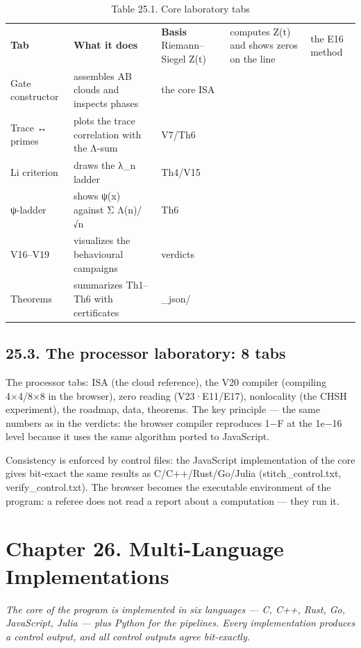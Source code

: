 \documentclass[11pt,a4paper]{article}
\begin{document}
\begin{table}[htbp]\centering\small
\caption{Table 25.1. Core laboratory tabs}
\begin{tabular}{p{} p{} p{}}
\toprule
\textbf{Tab} & \textbf{What it does} & \textbf{Basis}
\midrule
Riemann–Siegel Z(t) & computes Z(t) and shows zeros on the line & the E16 method \\
Gate constructor & assembles AB clouds and inspects phases & the core ISA \\
Trace ↔ primes & plots the trace correlation with the Λ-sum & V7/Th6 \\
Li criterion & draws the λ\_n ladder & Th4/V15 \\
ψ-ladder & shows ψ(x) against Σ Λ(n)/√n & Th6 \\
V16–V19 & visualizes the behavioural campaigns & verdicts \\
Theorems & summarizes Th1–Th6 with certificates & \_json/ \\
\bottomrule
\end{tabular}
\end{table}

\subsection{25.3. The processor laboratory: 8 tabs}

The processor tabs: ISA (the cloud reference), the V20 compiler (compiling 4×4/8×8 in the browser), zero reading (V23·E11/E17), nonlocality (the CHSH experiment), the roadmap, data, theorems. The key principle — the same numbers as in the verdicts: the browser compiler reproduces 1−F at the 1e−16 level because it uses the same algorithm ported to JavaScript.

Consistency is enforced by control files: the JavaScript implementation of the core gives bit-exact the same results as C/C++/Rust/Go/Julia (stitch\_control.txt, verify\_control.txt). The browser becomes the executable environment of the program: a referee does not read a report about a computation — they run it.

\section{Chapter 26. Multi-Language Implementations}

\noindent\textit{\color{copper}The core of the program is implemented in six languages — C, C++, Rust, Go, JavaScript, Julia — plus Python for the pipelines. Every implementation produces a control output, and all control outputs agree bit-exactly.}
\end{document}
